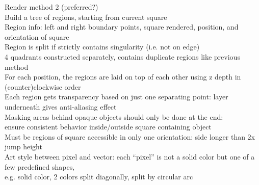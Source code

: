 \documentclass{article}
\begin{document}
Render method 2 (preferred?) \\
Build a tree of regions, starting from current square \\
Region info: left and right boundary points, square rendered,
position, and orientation of square \\
Region is split if strictly contains singularity (i.e. not on edge) \\
4 quadrants constructed separately,
contains duplicate regions like previous method \\
For each position, the regions are laid on top of each other using z depth
in (counter)clockwise order \\
Each region gets transparency based on just one separating point:
layer underneath gives anti-aliasing effect \\
Masking areas behind opaque objects should only be done at the end: \\
ensure consistent behavior inside/outside square containing object \\

Must be regions of square accessible in only one orientation:
side longer than 2x jump height \\

Art style between pixel and vector:
each ``pixel'' is not a solid color but one of a few predefined shapes, \\
e.g. solid color, 2 colors split diagonally, split by circular arc \\
\end{document}

